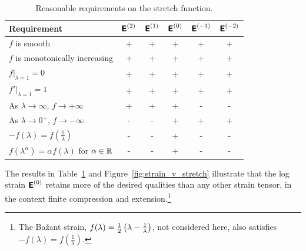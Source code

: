 \begin{table}[htb]
\caption{Reasonable requirements on the stretch function.}
\label{tab:stretch_function_requirements}
\begin{center}
    \begin{tabular}{|l|c|c|c|c|c|}
    \hline 
        {\bf Requirement} & 
        $\mbox{\sffamily\bfseries E}^{(2)}$ & 
        $\mbox{\sffamily\bfseries E}^{(1)}$ & 
        $\mbox{\sffamily\bfseries E}^{(0)}$ & 
        $\mbox{\sffamily\bfseries E}^{(-1)}$ & 
        $\mbox{\sffamily\bfseries E}^{(-2)}$ 
        \\ \hline \hline
$f$ is smooth 
        & + & + & + & + & + \\ \hline
$f$ is monotonically increasing
        & + & + & + & + & + \\ \hline
$\left. f \right|_{\lambda = 1} = 0$ 
        & + & + & + & + & + \\ \hline
$\left. f' \right|_{\lambda = 1} = 1$ 
        & + & + & + & + & + \\ \hline
As $\lambda \rightarrow \infty$, $f \rightarrow +\infty$ 
        & + & + & + & - & - \\ \hline
As $\lambda \rightarrow 0^+$, $f \rightarrow -\infty$ 
        & - & - & + & + & + \\ \hline
        $-f(\lambda) = f\left(\frac{1}{\lambda}\right)$
        & - & - & + & - & - \\ \hline
$f(\lambda^{\alpha}) = \alpha f(\lambda)$ for $\alpha \in \mathbb{R}$ 
        & - & - & + & - & - \\ \hline
\end{tabular}
\end{center}
\end{table}


The results in Table~\ref{tab:stretch_function_requirements} and 
Figure~\ref{fig:strain_v_stretch}
illustrate that the log strain $\mbox{\sffamily\bfseries E}^{(0)}$ retains more of the desired qualities than any other strain tensor, in the context finite compression and extension.\footnote{ The Ba\v{z}ant strain, $f(\lambda) = \frac{1}{2}\left(\lambda - \frac{1}{\lambda}\right)$, not considered here, also satisfies $-f(\lambda) = f\left(\frac{1}{\lambda}\right)$.}

